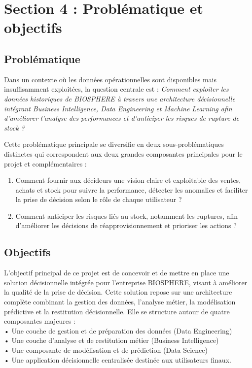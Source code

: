 \section{Section 4 : Problématique et objectifs}
\subsection{Problématique}
Dans un contexte où les données opérationnelles sont disponibles mais insuffisamment exploitées, la question centrale est : \textit{Comment exploiter les données historiques de BIOSPHERE à travers une architecture décisionnelle intégrant Business Intelligence, Data Engineering et Machine Learning afin d’améliorer l’analyse des performances et d’anticiper les risques de rupture de stock ?}

Cette problématique principale se diversifie en deux sous-problématiques distinctes qui correspondent aux deux grandes composantes principales pour le projet et complémentaires :
\begin{enumerate}
    \item Comment fournir aux décideurs une vision claire et exploitable des ventes, achats et stock pour suivre la performance, détecter les anomalies et faciliter la prise de décision selon le rôle de chaque utilisateur ?
    \item Comment anticiper les risques liés au stock, notamment les ruptures, afin d’améliorer les décisions de réapprovisionnement et prioriser les actions ?
\end{enumerate}

\subsection{Objectifs}
L’objectif principal de ce projet est de concevoir et de mettre en place une solution décisionnelle intégrée pour l’entreprise BIOSPHERE, visant à améliorer la qualité de la prise de décision. Cette solution repose sur une architecture complète combinant la gestion des données, l’analyse métier, la modélisation prédictive et la restitution décisionnelle.
Elle se structure autour de quatre composantes majeures :\\
    • Une couche de gestion et de préparation des données (Data Engineering)\\
    • Une couche d’analyse et de restitution métier (Business Intelligence)\\
    • Une composante de modélisation et de prédiction (Data Science)\\
    • Une application décisionnelle centralisée destinée aux utilisateurs finaux.\\

